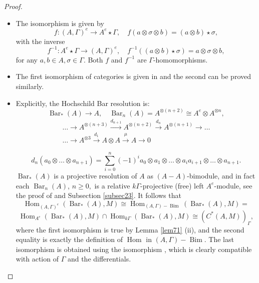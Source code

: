 \documentclass[pdflatex,sn-mathphys-num]{sn-jnl}
\numberwithin{equation}{section}
\theoremstyle{thmstyleone}
\theoremstyle{thmstyletwo}
\theoremstyle{thmstylethree}
\newcommand{\Bim}{\operatorname{Bim}}
\newcommand{\Barc}{\operatorname{Bar}}
\newcommand{\Hom}{\operatorname{Hom}}
\begin{document}
\begin{proof}\quad
\begin{itemize}
\item[(i)] The isomorphism is given by $$f:(A,\Gamma)^e\rightarrow A^e\star\Gamma,\quad f(a\otimes \sigma\otimes b)=(a\otimes b)\star\sigma,$$
with the inverse $$f^{-1}: A^e\star\Gamma\rightarrow (A,\Gamma)^e, \quad f^{-1}((a\otimes b)\star\sigma)=a\otimes \sigma\otimes b,$$
for any $a,b\in A, \sigma\in \Gamma.$
Both $f$ and $f^{-1}$ are $\Gamma$-homomorphisms.
\item[(ii)] The first isomorphism of categories is given in \cite[Lemma 6.1]{KoPi} and the second can be proved similarly.
\item [(iii)] Explicitly, the Hochschild Bar resolution is:
$$\Barc_*(A) \rightarrow A, \quad \Barc_n(A) = A^{\otimes(n+2)} \cong A^e \otimes A^{\otimes n},$$
\begin{gather*}
\dots\to A^{\otimes (n+3)} \xrightarrow{d_{n+1}} A^{\otimes (n+2)} \xrightarrow{d_{n}} A^{\otimes (n+1)} \to \dots \\
\dots \to A^{\otimes 3} \xrightarrow{d_{1}} A\otimes A \xrightarrow{\mu} A \to 0
\end{gather*}

$$d_n(a_0 \otimes \dots \otimes a_{n+1}) = \sum_{i=0}^n (-1)^i a_0 \otimes a_1 \otimes \dots \otimes a_i a_{i+1} \otimes \dots \otimes a_{n+1}.$$
$\Barc_*(A)$ is a projective resolution of $A$ as $(A-A)$-bimodule, and in fact each $\Barc_n(A)$, $n\geq 0,$ is a relative  $k\Gamma$-projective (free) left $A^e$-module, see the proof of \cite[Theorem 5.6 (3)]{In} and Subsection \ref{subsec23}. It follows that
$$\Hom_{(A,\Gamma)^e}(\Barc_*(A),M)\cong \Hom_{(A,\Gamma)-\Bim}(\Barc_*(A),M)=$$ $$\Hom_{A^e}(\Barc_*(A),M)\cap\Hom_{k\Gamma}(\Barc_*(A),M)\cong
(C^*(A,M))_{\Gamma}, $$
where the first isomorphism is true by Lemma \ref{lem71} (ii), and the second equality is exactly the definition of $\Hom$ in $(A,\Gamma)-\Bim.$  The last isomorphism is obtained using the isomorphism \cite[(1.1.11)]{Wi}, which  is clearly compatible with action of $\Gamma$ and the differentials.
\end{itemize}
\end{proof}
\end{document}
